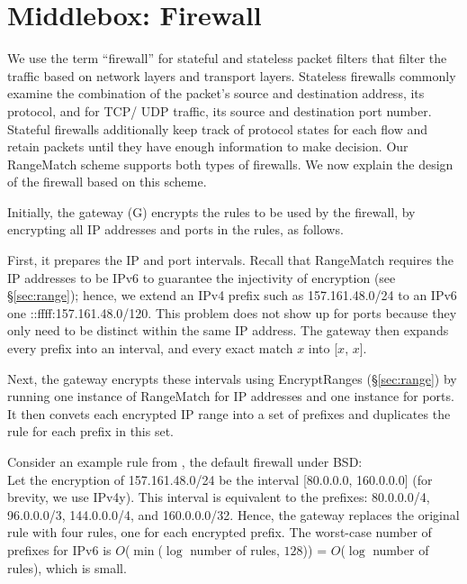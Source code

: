 

\section{Middlebox: Firewall}\label{sec:firewall}


We use the term ``firewall'' for stateful and stateless packet filters that filter the traffic based on network layers and transport layers. Stateless firewalls commonly examine the combination of the packet's source and destination address, its protocol, and for TCP/ UDP traffic, its source and destination port number. Stateful firewalls additionally keep track of protocol states for each flow and retain packets until they have enough information to make decision. 
Our RangeMatch scheme supports both types of firewalls. We now explain the design of the firewall based on this scheme.

 Initially, the gateway (G) encrypts the rules to be used by the firewall, by encrypting all IP addresses and ports in the rules, as follows.


First, it prepares the IP and port intervals. Recall that RangeMatch requires the IP addresses to be IPv6 to guarantee the injectivity of encryption (see \S\ref{sec:range}); hence, we extend an IPv4 prefix  such as 157.161.48.0/24 to an IPv6 one  ::ffff:157.161.48.0/120. 
 This problem does not show up for ports because they only need to be distinct within the same IP address.
The gateway then expands every prefix into an interval, and every exact match $x$ into [$x$, $x$]. 

Next, the gateway encrypts these intervals using EncryptRanges (\S\ref{sec:range}) by running one instance of RangeMatch for IP addresses and one instance for ports.
It then convets each encrypted IP range into a set of prefixes and duplicates the rule for each prefix in this set. 

Consider an example rule from  , the 
default firewall under BSD:
  \\ 
Let the encryption of 157.161.48.0/24 be the interval [80.0.0.0, 160.0.0.0] (for brevity, we use IPv4y). 
This interval is equivalent to the prefixes: 80.0.0.0/4, 96.0.0.0/3, 144.0.0.0/4, and 160.0.0.0/32. 
Hence, the gateway replaces the original rule with four rules, one for each encrypted prefix. 
The worst-case number of prefixes for IPv6 is $O$($\min$($\log$ number of rules, $128$)) = $O$($\log$ number of rules), 
which is small. 



